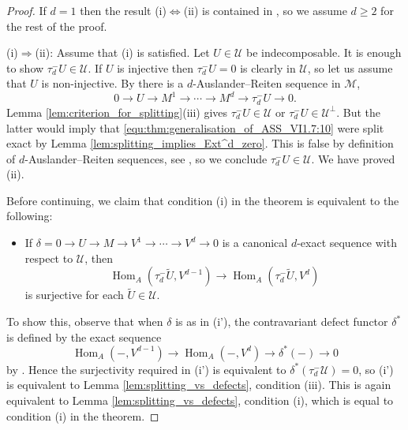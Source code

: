 \documentclass[12pt,reqno]{amsart}
\def\cM{\mathscr{M}}
\def\cU{\mathscr{U}}
\def\Hom{\operatorname{Hom}}
\numberwithin{equation}{section}
\theoremstyle{definition}
\theoremstyle{theorem}
\theoremstyle{definition}
\begin{document}
\begin{proof}
If $d=1$ then the result (i)$\Leftrightarrow$(ii) is contained in \cite[prop.\ VI.1.7]{Assem-Simson-Skowronski_Elements-I}, so we assume $d \geqslant 2$ for the rest of the proof.

(i)$\Rightarrow$(ii):  Assume that (i) is satisfied.  Let $U \in \cU$ be indecomposable.  It is enough to show $\tau_d^-U \in \cU$.  If $U$ is injective then $\tau_d^-U = 0$ is clearly in $\cU\!$, so let us assume that $U$ is non-injective.  By \cite[thm.\ 3.3.1]{Iyama_Higher-dimensional-AR-theory} there is a $d$-Auslander--Reiten sequence in $\cM\!$,
\begin{equation}
\label{equ:thm:generalisation_of_ASS_VI1.7:10}
  0
  \xrightarrow{} U 
  \xrightarrow{} M^1 
  \xrightarrow{} \cdots
  \xrightarrow{} M^d
  \xrightarrow{} \tau_d^-U 
  \xrightarrow{} 0.
\end{equation}
Lemma \ref{lem:criterion_for_splitting}(iii) gives $\tau_d^-U \in \cU$ or $\tau_d^-U \in \cU^{ \perp }$.  But the latter would imply that \eqref{equ:thm:generalisation_of_ASS_VI1.7:10} were split exact by Lemma \ref{lem:splitting_implies_Ext^d_zero}.  This is false by definition of $d$-Auslander--Reiten sequences, see \cite[p.\ 33]{Iyama_Higher-dimensional-AR-theory}, so we conclude $\tau_d^-U \in \cU$.  We have proved (ii).

Before continuing, we claim that condition (i) in the theorem is equivalent to the following:
\begin{itemize}
\setlength\itemsep{4pt}

  \item[(i')]  If $\delta = 0 \xrightarrow{} U \xrightarrow{} M \xrightarrow{} V^1 \xrightarrow{} \cdots \xrightarrow{} V^d \xrightarrow{} 0$ is a canonical $d$-exact sequence with respect to $\cU$, then
\[  
  \Hom_A( \tau_d^-\widetilde{ U },V^{ d-1 } )
  \xrightarrow{}
  \Hom_A( \tau_d^-\widetilde{ U },V^{ d } )
\]  
is surjective for each $\widetilde{ U } \in \cU$.  

\end{itemize}
To show this, observe that when $\delta$ is as in (i'), the contravariant defect functor $\delta^*$ is defined by the exact sequence
\[
  \Hom_A( -,V^{ d-1 } )
  \xrightarrow{}
  \Hom_A( -,V^d )
  \xrightarrow{}
  \delta^*( - )
  \xrightarrow{}
  0
\]
by \cite[def.\ 3.1]{Jasso-Kvamme_Introduction-to_higher_AR-theory}.  Hence the surjectivity required in (i') is equivalent to $\delta^*( \tau_d^-\cU ) = 0$, so (i') is equivalent to Lemma \ref{lem:splitting_vs_defects}, condition (iii).  This is again equivalent to Lemma \ref{lem:splitting_vs_defects}, condition (i), which is equal to condition (i) in the theorem.


\end{proof}
\end{document}

